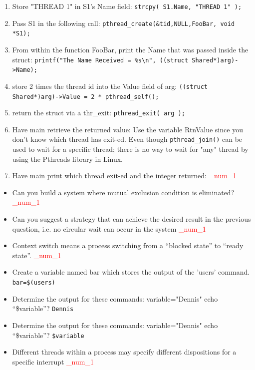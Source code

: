 \documentclass[9pt,landscape]{memoir}
\newcommand{\answer}[1]{\textcolor{red}{_num_1}}
\begin{document}
\begin{multicols}{6}
\begin{enumerate}
    \item Store "THREAD 1" in S1's Name field:  \verb$strcpy( S1.Name, "THREAD 1" );$
    \item Pass S1 in the following call:  \verb$pthread_create(&tid,NULL,FooBar, void *S1);$
    \item From within the function FooBar, print the Name that was passed inside the struct:  \texttt{printf("The Name Received = \%s\textbackslash n", ((struct Shared*)arg)->Name);}
    \item store 2 times the thread id into the Value field of arg:  \verb$((struct Shared*)arg)->Value = 2 * pthread_self();$
    \item return the struct via a thr\_exit: \verb$pthread_exit( arg );$
    \item Have main retrieve the returned value:  Use the variable RtnValue since you don't know which thread has exit-ed. Even though \verb$pthread_join()$ can be used to wait for a specific thread; there is no way to wait for "any" thread by using the Pthreads library in Linux.
    \item Have main print which thread exit-ed and the integer returned: \answer{Same.}
\end{enumerate}
\hfill
\begin{itemize}
    \item Can you build a system where mutual exclusion condition is eliminated?  \answer{No. It is a resource constraint and most resources (if not all) require it.}
    \item Can you suggest a strategy that can achieve the desired result in the previous question, i.e. no circular wait can occur in the system \answer{Assign a number to each resource and require that, at any moment, a process can only request a resource whose number is higher than that of any resource it is currently holding.}
    \item Context switch means a process switching from a ``blocked state'' to ``ready state''.  \answer{False}
    \item Create a variable named bar which stores the output of the 'users' command. \verb|bar=$(users)|
    \item Determine the output for these commands: variable="Dennis" echo ``\$variable''? \verb$Dennis$
    \item Determine the output for these commands: variable="Dennis" echo ``\$variable''? \verb|$variable|
    \item Different threads within a process may specify different dispositions for a specific interrupt \answer{True}

\end{itemize}
\end{multicols}
\end{document}
